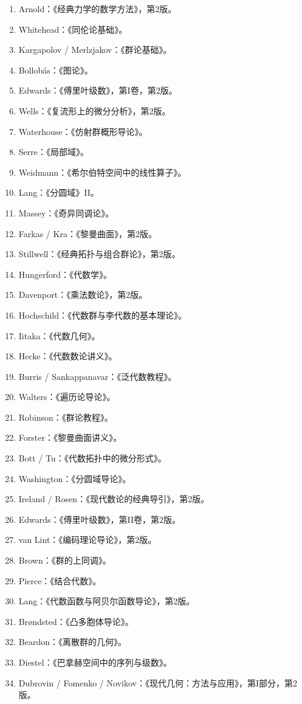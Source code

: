 \begin{enumerate}[leftmargin=3em,label=\arabic*.]
\item Arnold：《经典力学的数学方法》，第2版。
\item Whitehead：《同伦论基础》。
\item Kargapolov / Merlzjakov：《群论基础》。
\item Bollobás：《图论》。
\item Edwards：《傅里叶级数》，第I卷，第2版。
\item Wells：《复流形上的微分分析》，第2版。
\item Waterhouse：《仿射群概形导论》。
\item Serre：《局部域》。
\item Weidmann：《希尔伯特空间中的线性算子》。
\item Lang：《分圆域》II。
\item Massey：《奇异同调论》。
\item Farkas / Kra：《黎曼曲面》，第2版。
\item Stillwell：《经典拓扑与组合群论》，第2版。
\item Hungerford：《代数学》。
\item Davenport：《乘法数论》，第2版。
\item Hochschild：《代数群与李代数的基本理论》。
\item Iitaka：《代数几何》。
\item Hecke：《代数数论讲义》。
\item Burris / Sankappanavar：《泛代数教程》。
\item Walters：《遍历论导论》。
\item Robinson：《群论教程》。
\item Forster：《黎曼曲面讲义》。
\item Bott / Tu：《代数拓扑中的微分形式》。
\item Washington：《分圆域导论》。
\item Ireland / Rosen：《现代数论的经典导引》，第2版。
\item Edwards：《傅里叶级数》，第II卷，第2版。
\item van Lint：《编码理论导论》，第2版。
\item Brown：《群的上同调》。
\item Pierce：《结合代数》。
\item Lang：《代数函数与阿贝尔函数导论》，第2版。
\item Brøndsted：《凸多胞体导论》。
\item Beardon：《离散群的几何》。
\item Diestel：《巴拿赫空间中的序列与级数》。
\item Dubrovin / Fomenko / Novikov：《现代几何：方法与应用》，第I部分，第2版。

\end{enumerate}
